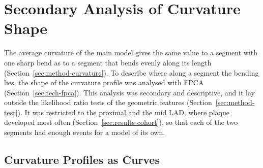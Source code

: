 %
\section{Secondary Analysis of Curvature Shape}
\label{sec:method-fpca}

The average curvature of the main model gives the same value to a segment with one sharp bend as to a segment that bends evenly along its length (Section~\ref{sec:method-curvature}).
To describe where along a segment the bending lies, the shape of the curvature profile was analysed with FPCA (Section~\ref{sec:tech-fpca}).
This analysis was secondary and descriptive, and it lay outside the likelihood ratio tests of the geometric features (Section~\ref{sec:method-test}).
It was restricted to the proximal and the mid LAD, where plaque developed most often (Section~\ref{sec:results-cohort}), so that each of the two segments had enough events for a model of its own.

\subsection{Curvature Profiles as Curves}

